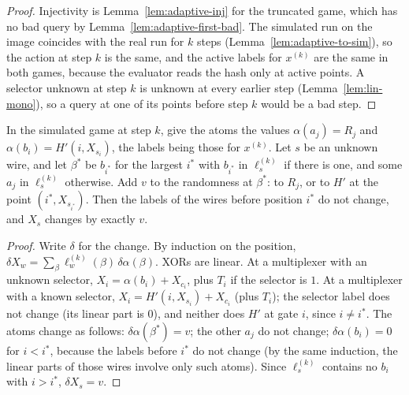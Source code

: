 \begin{proof}
  \leanok
  Injectivity is Lemma~\ref{lem:adaptive-inj} for the truncated game, which has no bad query by
  Lemma~\ref{lem:adaptive-first-bad}. The simulated run on the image coincides with the real run for
  $k$ steps (Lemma~\ref{lem:adaptive-to-sim}), so the action at step $k$ is the same, and the active
  labels for $x^{(k)}$ are the same in both games, because the evaluator reads the hash only at
  active points. A selector unknown at step $k$ is unknown at every earlier step
  (Lemma~\ref{lem:lin-mono}), so a query at one of its points before step $k$ would be a bad step.
\end{proof}

\begin{lemma}
  \label{lem:adaptive-shift}
  \leanok
  In the simulated game at step $k$, give the atoms the values $\alpha(a_j) = R_j$ and $\alpha(b_i) =
  H'(i, X_{s_i})$, the labels being those for $x^{(k)}$. Let $s$ be an unknown wire, and let
  $\beta^*$ be $b_{i^*}$ for the largest $i^*$ with $b_{i^*}$ in $\ell^{(k)}_s$ if there is one,
  and some $a_j$ in $\ell^{(k)}_s$ otherwise. Add $v$ to the randomness at $\beta^*$: to $R_j$, or to
  $H'$ at the point $(i^*, X_{s_{i^*}})$. Then the labels of the wires before position $i^*$ do not
  change, and $X_s$ changes by exactly $v$.
\end{lemma}

\begin{proof}
  \leanok
  Write $\delta$ for the change. By induction on the position, $\delta X_w = \sum_\beta
  \ell^{(k)}_w(\beta)\, \delta\alpha(\beta)$. XORs are linear. At a multiplexer with an unknown
  selector, $X_i = \alpha(b_i) + X_{c_i}$, plus $T_i$ if the selector is $1$. At a multiplexer with a
  known selector, $X_i = H'(i, X_{s_i}) + X_{c_i}$ (plus $T_i$); the selector label does not change
  (its linear part is $0$), and neither does $H'$ at gate $i$, since $i \neq i^*$. The atoms change
  as follows: $\delta\alpha(\beta^*) = v$; the other $a_j$ do not change; $\delta\alpha(b_i) = 0$ for
  $i < i^*$, because the labels before $i^*$ do not change (by the same induction, the linear parts
  of those wires involve only such atoms). Since $\ell^{(k)}_s$ contains no $b_i$ with $i > i^*$,
  $\delta X_s = v$.
\end{proof}

